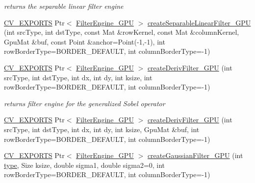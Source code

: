 \begin{DoxyCompactItemize}
\begin{DoxyCompactList}\small\item\em returns the separable linear filter engine \end{DoxyCompactList}\item 
\hyperlink{core_2types__c_8h_a1bf9f0e121b54272da02379cfccd0a2b}{C\-V\-\_\-\-E\-X\-P\-O\-R\-T\-S} Ptr$<$ \hyperlink{classcv_1_1gpu_1_1FilterEngine__GPU}{Filter\-Engine\-\_\-\-G\-P\-U} $>$ \hyperlink{namespacecv_1_1gpu_a65302c06685c0c76eb619474c810ca92}{create\-Separable\-Linear\-Filter\-\_\-\-G\-P\-U} (int src\-Type, int dst\-Type, const Mat \&row\-Kernel, const Mat \&column\-Kernel, Gpu\-Mat \&buf, const Point \&anchor=Point(-\/1,-\/1), int row\-Border\-Type=B\-O\-R\-D\-E\-R\-\_\-\-D\-E\-F\-A\-U\-L\-T, int column\-Border\-Type=-\/1)
\item 
\hyperlink{core_2types__c_8h_a1bf9f0e121b54272da02379cfccd0a2b}{C\-V\-\_\-\-E\-X\-P\-O\-R\-T\-S} Ptr$<$ \hyperlink{classcv_1_1gpu_1_1FilterEngine__GPU}{Filter\-Engine\-\_\-\-G\-P\-U} $>$ \hyperlink{namespacecv_1_1gpu_a22f92d67f1101beca408af27ad656f06}{create\-Deriv\-Filter\-\_\-\-G\-P\-U} (int src\-Type, int dst\-Type, int dx, int dy, int ksize, int row\-Border\-Type=B\-O\-R\-D\-E\-R\-\_\-\-D\-E\-F\-A\-U\-L\-T, int column\-Border\-Type=-\/1)
\begin{DoxyCompactList}\small\item\em returns filter engine for the generalized Sobel operator \end{DoxyCompactList}\item 
\hyperlink{core_2types__c_8h_a1bf9f0e121b54272da02379cfccd0a2b}{C\-V\-\_\-\-E\-X\-P\-O\-R\-T\-S} Ptr$<$ \hyperlink{classcv_1_1gpu_1_1FilterEngine__GPU}{Filter\-Engine\-\_\-\-G\-P\-U} $>$ \hyperlink{namespacecv_1_1gpu_a36bed7005a44262e900c3f16f7b03c7c}{create\-Deriv\-Filter\-\_\-\-G\-P\-U} (int src\-Type, int dst\-Type, int dx, int dy, int ksize, Gpu\-Mat \&buf, int row\-Border\-Type=B\-O\-R\-D\-E\-R\-\_\-\-D\-E\-F\-A\-U\-L\-T, int column\-Border\-Type=-\/1)
\item 
\hyperlink{core_2types__c_8h_a1bf9f0e121b54272da02379cfccd0a2b}{C\-V\-\_\-\-E\-X\-P\-O\-R\-T\-S} Ptr$<$ \hyperlink{classcv_1_1gpu_1_1FilterEngine__GPU}{Filter\-Engine\-\_\-\-G\-P\-U} $>$ \hyperlink{namespacecv_1_1gpu_ad68c426ac3a0d3528f3f082432fda476}{create\-Gaussian\-Filter\-\_\-\-G\-P\-U} (int \hyperlink{imgproc__c_8h_a84612d8738bf935200cf32a103d8efe1}{type}, Size ksize, double sigma1, double sigma2=0, int row\-Border\-Type=B\-O\-R\-D\-E\-R\-\_\-\-D\-E\-F\-A\-U\-L\-T, int column\-Border\-Type=-\/1)

\end{DoxyCompactItemize}
